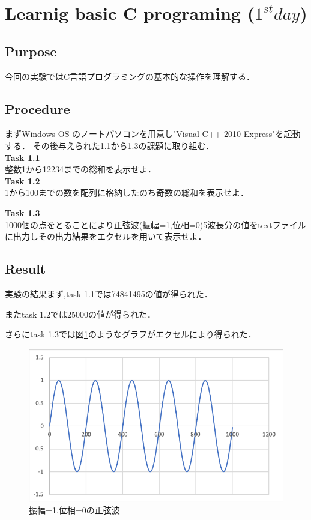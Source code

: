 \documentclass[11pt, a4paper,twocolumn]{jarticle}
\begin{document}
\section{Learnig basic C programing ($1^{st} day$)}

\subsection{Purpose}
今回の実験ではC言語プログラミングの基本的な操作を理解する．

\subsection{Procedure}
まずWindows OS のノートパソコンを用意し"Visual C++ 2010 Express"を起動する．
その後与えられた1.1から1.3の課題に取り組む．　\\
\textbf{Task 1.1} \\
整数1から12234までの総和を表示せよ． \\

\noindent
\textbf{Task 1.2} \\
1から100までの数を配列に格納したのち奇数の総和を表示せよ．

\noindent
\textbf{Task 1.3} \\
1000個の点をとることにより正弦波(振幅=1,位相=0)5波長分の値をtextファイルに出力しその出力結果をエクセルを用いて表示せよ．
\subsection{Result}
実験の結果まず,task 1.1では74841495の値が得られた．

またtask 1.2では25000の値が得られた．

さらにtask 1.3では図\ref{fig:1}のようなグラフがエクセルにより得られた．

\begin{figure}[htbp]
 \begin{center}
  \includegraphics[width=0.8\linewidth]{fig1.png}
 \end{center}
 \caption{振幅=1,位相=0の正弦波}
 \label{fig:1}
\end{figure}
\end{document}
